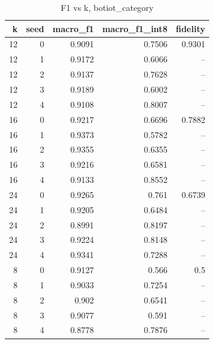 \begin{table}
\caption{F1 vs k, botiot_category}
\begin{tabular}{rrrrr}
\toprule
k & seed & macro_f1 & macro_f1_int8 & fidelity \\
\midrule
12 & 0 & 0.9091 & 0.7506 & 0.9301 \\
12 & 1 & 0.9172 & 0.6066 & -- \\
12 & 2 & 0.9137 & 0.7628 & -- \\
12 & 3 & 0.9189 & 0.6002 & -- \\
12 & 4 & 0.9108 & 0.8007 & -- \\
16 & 0 & 0.9217 & 0.6696 & 0.7882 \\
16 & 1 & 0.9373 & 0.5782 & -- \\
16 & 2 & 0.9355 & 0.6355 & -- \\
16 & 3 & 0.9216 & 0.6581 & -- \\
16 & 4 & 0.9133 & 0.8552 & -- \\
24 & 0 & 0.9265 & 0.761 & 0.6739 \\
24 & 1 & 0.9205 & 0.6484 & -- \\
24 & 2 & 0.8991 & 0.8197 & -- \\
24 & 3 & 0.9224 & 0.8148 & -- \\
24 & 4 & 0.9341 & 0.7288 & -- \\
8 & 0 & 0.9127 & 0.566 & 0.5 \\
8 & 1 & 0.9033 & 0.7254 & -- \\
8 & 2 & 0.902 & 0.6541 & -- \\
8 & 3 & 0.9077 & 0.591 & -- \\
8 & 4 & 0.8778 & 0.7876 & -- \\
\bottomrule
\end{tabular}
\end{table}
